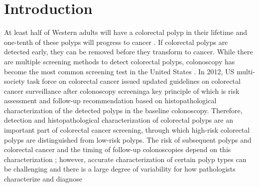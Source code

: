 \documentclass[review]{elsarticle}
\begin{document}
\section{Introduction}\label{introduction}
At least half of Western adults will have a colorectal polyp in their
lifetime and one-tenth of these polyps will progress to cancer \citep{wong2009observer}.
If colorectal polyps are detected early, they can be removed before they transform to cancer.
While there are multiple screening methods to detect colorectal polyps, colonoscopy has become
the most common screening test in the United States \citep{lieberman2012guidelines}.
In 2012, US multi-society task force on colorectal cancer issued updated guidelines
on colorectal cancer surveillance after colonoscopy screening\textemdash a key principle of which is risk
assessment and follow-up recommendation based on histopathological characterization of the
detected polyps in the baseline colonoscopy. Therefore, detection and histopathological
characterization of colorectal polyps are an important part of colorectal cancer screening,
through which high-risk colorectal polyps are distinguished from low-risk polyps.
The risk of subsequent polyps and colorectal cancer and the timing of follow-up
colonoscopies depend on this characterization \citep{lieberman2012guidelines}; however,
accurate characterization of certain polyp types can be challenging and there
is a large degree of variability for how pathologists characterize and diagnose
\end{document}
